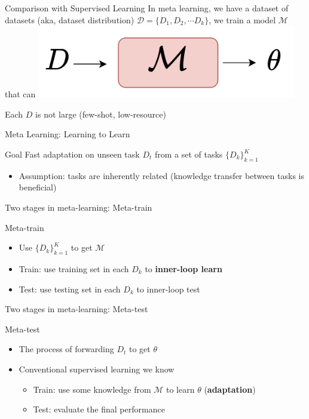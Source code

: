 \documentclass{beamer}
\begin{document}
\begin{frame}[t]{Comparison with Supervised Learning}
  In meta learning, we have a dataset of datasets (aka, dataset distribution) $\mathcal{D} = \lbrace D_1, D_2, \cdots D_k \rbrace$, we train a model $\mathcal{M}$ that can
  \center \includegraphics[width=0.85\textwidth]{fig/meta_learning.png}

  Each $D$ is not large (few-shot, low-resource)
\end{frame}

\begin{frame}[t]{Meta Learning: Learning to Learn}
  \begin{block}{Goal}
    Fast adaptation on unseen task $D_t$ from a set of tasks $\{ D_k\}^{K}_{k=1}$ 
  \end{block}
  \pause 

  \begin{itemize}
    \item Assumption: tasks are inherently related (knowledge transfer between tasks is beneficial)
  \end{itemize}
\end{frame}

\begin{frame}[t]{Two stages in meta-learning: Meta-train}
  \begin{block}{Meta-train}
    \begin{itemize}
      \item Use $\{ D_k \}^{K}_{k=1}$ to get $\mathcal{M}$
      \item Train: use training set in each $D_k$ to \textbf{inner-loop learn}
      \item Test: use testing set in each $D_k$ to inner-loop test
    \end{itemize}
  \end{block}
\end{frame}

\begin{frame}[t]{Two stages in meta-learning: Meta-test}
  \begin{block}{Meta-test}
    \begin{itemize}
      \item The process of forwarding $D_t$ to get $\theta$
      \item Conventional supervised learning we know
      \begin{itemize}
        \item Train: use some knowledge from $\mathcal{M}$ to learn $\theta$ (\textbf{adaptation})
        \item Test: evaluate the final performance
      \end{itemize}
    \end{itemize}
  \end{block}
\end{frame}
\end{document}
